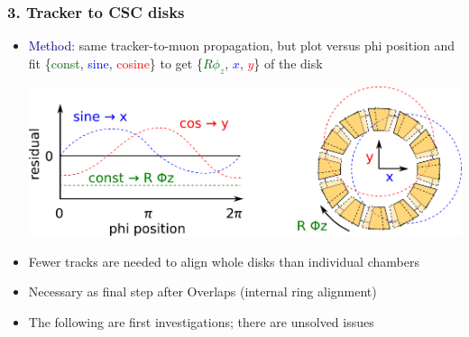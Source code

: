 \documentclass[compress]{beamer}
\begin{document}
\begin{frame}
\frametitle{3. Tracker to CSC disks}

\begin{itemize}
\item \textcolor{darkblue}{Method:} same tracker-to-muon propagation, but plot versus phi position and fit \{\textcolor{darkgreen}{const}, \textcolor{blue}{sine}, \textcolor{red}{cosine}\} to get \{\textcolor{darkgreen}{$R \phi_z$}, \textcolor{blue}{$x$}, \textcolor{red}{$y$}\} of the disk

\begin{center}
\includegraphics[width=0.9\linewidth]{tracker_disk_interpretation.pdf}
\end{center}

\item Fewer tracks are needed to align whole disks than individual chambers
\item Necessary as final step after Overlaps (internal ring alignment)
\item The following are first investigations; there are unsolved issues
\end{itemize}
\end{frame}
\end{document}
